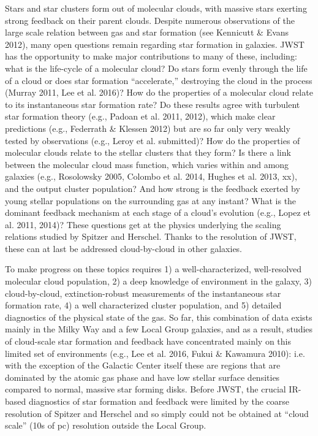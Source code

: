 \documentclass[12pt]{article}
\begin{document}
Stars and star clusters form out of molecular clouds, with massive stars exerting strong feedback on their parent clouds. Despite numerous observations of the large scale relation between gas and star formation (see Kennicutt \& Evans 2012), many open questions remain regarding star formation in galaxies. JWST has the opportunity to make major contributions to many of these, including: what is the life-cycle of a molecular cloud? Do stars form evenly through the life of a cloud or does star formation “accelerate,” destroying the cloud in the process (Murray 2011, Lee et al. 2016)? How do the properties of a molecular cloud relate to its instantaneous star formation rate? Do these results agree with turbulent star formation theory (e.g., Padoan et al. 2011, 2012), which make clear predictions (e.g., Federrath \& Klessen 2012) but are so far only very weakly tested by observations (e.g., Leroy et al. submitted)? How do the properties of molecular clouds relate to the stellar clusters that they form? Is there a link between the molecular cloud mass function, which varies within and among galaxies (e.g., Rosolowsky 2005, Colombo et al. 2014, Hughes et al. 2013, xx), and the output cluster population? And how strong is the feedback exerted by young stellar populations on the surrounding gas at any instant? What is the dominant feedback mechanism at each stage of a cloud’s evolution (e.g., Lopez et al. 2011, 2014)? These questions get at the physics underlying the scaling relations studied by Spitzer and Herschel. Thanks to the resolution of JWST, these can at last be addressed cloud-by-cloud in other galaxies.

To make progress on these topics requires 1) a well-characterized, well-resolved molecular cloud population, 2) a deep knowledge of environment in the galaxy, 3) cloud-by-cloud, extinction-robust measurements of the instantaneous star formation rate, 4) a well characterized cluster population, and 5) detailed diagnostics of the physical state of the gas. So far, this combination of data exists mainly in the Milky Way and a few Local Group galaxies, and as a result, studies of cloud-scale star formation and feedback have concentrated mainly on this limited set of environments (e.g., Lee et al. 2016, Fukui \& Kawamura 2010): i.e. with the exception of the Galactic Center itself these are regions that are dominated by the atomic gas phase and have low stellar surface densities compared to normal, massive star forming disks. Before JWST, the crucial IR-based diagnostics of star formation and feedback were limited by the coarse resolution of Spitzer and Herschel and so simply could not be obtained at “cloud scale” (10s of pc) resolution outside the Local Group.
\end{document}
